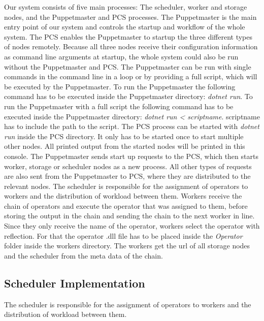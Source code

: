 \documentclass[times, 10pt,twocolumn]{article}
\begin{document}
Our system consists of five main processes: The scheduler, worker and storage nodes, and the Puppetmaster and PCS processes.
The Puppetmaster is the main entry point of our system and controls the startup and workflow of the whole system.
The PCS enables the Puppetmaster to startup the three different types of nodes remotely.
Because all three nodes receive their configuration information as command line arguments at startup, the whole system could also be run without the Puppetmaster and PCS.
The Puppetmaster can be run with single commands in the command line in a loop or by providing a full script, which will be executed by the Puppetmaster. \newline
To run the Puppetmaster the following command has to be executed inside the Puppetmaster directory:
\emph{dotnet run}. \newline
To run the Puppetmaster with a full script the following command has to be executed inside the Puppetmaster directory: 
\emph{dotnet run < scriptname}.
scriptname has to include the path to the script. \newline
The PCS process can be started with \emph{dotnet run} inside the PCS directory.
It only has to be started once to start multiple other nodes.
All printed output from the started nodes will be printed in this console.
The Puppetmaster sends start up requests to the PCS, which then starts worker, storage or scheduler nodes as a new process.
All other types of requests are also sent from the Puppetmaster to PCS, where they are distributed to the relevant nodes. \newline
The scheduler is responsible for the assignment of operators to workers and the distribution of workload between them.
Workers receive the chain of operators and execute the operator that was assigned to them, before storing the output in the chain and sending the chain to the next worker in line.
Since they only receive the name of the operator, workers select the operator with reflection.
For that the operator .dll file has to be placed inside the \emph{Operator} folder inside the workers directory.
The workers get the url of all storage nodes and the scheduler from the meta data of the chain.
\newline


\subsection{Scheduler Implementation}

The scheduler is responsible for the assignment of operators to workers and the distribution of workload between them.
\end{document}

